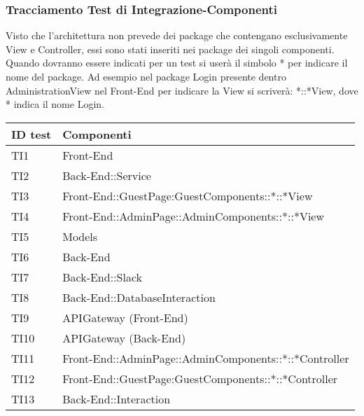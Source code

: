 \documentclass[../PianoDiQualifica_v3.0.0.tex]{subfiles}
\begin{document}
	\subsubsection{Tracciamento Test di Integrazione-Componenti}
	Visto che l'architettura non prevede dei package che contengano esclusivamente View e Controller, essi sono stati inseriti nei package dei singoli componenti. Quando dovranno essere indicati per un test si userà il simbolo * per indicare il nome del package. Ad esempio nel package Login presente dentro AdministrationView nel Front-End per indicare la View si scriverà: *::*View, dove * indica il nome Login.
	\begin{longtable}[c] { >{\centering\arraybackslash}p{2cm} >{\centering\arraybackslash}p{11cm}}
		\toprule
		\centerline{\textbf{ID test}} & \centerline{\textbf{Componenti}} \\
			\midrule
			TI1 & Front-End \\
			\addlinespace[0.3em]
			\midrule
			\addlinespace[0.3em]
			TI2 & Back-End::Service \\
			\addlinespace[0.3em]
			\midrule
			\addlinespace[0.3em]
			TI3 & Front-End::GuestPage:GuestComponents::*::*View \\
			\addlinespace[0.3em]
			\midrule
			\addlinespace[0.3em]
			TI4 & Front-End::AdminPage::AdminComponents::*::*View \\
			\addlinespace[0.3em]
			\midrule
			\addlinespace[0.3em]
			TI5 & Models \\
			\addlinespace[0.3em]
			\midrule
			\addlinespace[0.3em]
			TI6 & Back-End \\
			\addlinespace[0.3em]
			\midrule
			\addlinespace[0.3em]
			TI7 & Back-End::Slack \\
			\addlinespace[0.3em]
			\midrule
			\addlinespace[0.3em]
			TI8 & Back-End::DatabaseInteraction \\
			\addlinespace[0.3em]
			\midrule
			\addlinespace[0.3em]
			TI9 & APIGateway (Front-End)\\
			\addlinespace[0.3em]
			\midrule
			\addlinespace[0.3em]
			TI10 & APIGateway (Back-End) \\
			\addlinespace[0.3em]
			\midrule
			\addlinespace[0.3em]
			TI11 &  Front-End::AdminPage::AdminComponents::*::*Controller \\
			\addlinespace[0.3em]
			\midrule
			\addlinespace[0.3em]
			TI12 & Front-End::GuestPage:GuestComponents::*::*Controller \\
			\addlinespace[0.3em]
			\midrule
			\addlinespace[0.3em]
			TI13 & Back-End::Interaction \\

\end{longtable}
\end{document}
